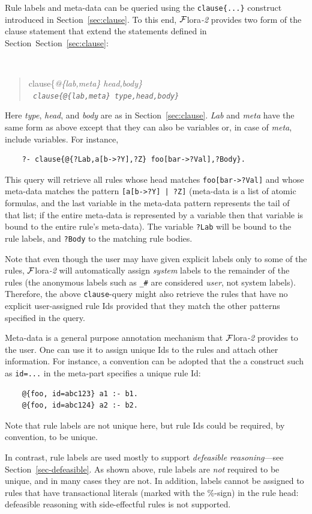 \documentclass[11pt]{article}
\newcommand{\FLORA}{{\mbox{\sc ${\cal F}${lora}\rm\emph{-2}}}\xspace}
\begin{document}
Rule labels and meta-data can be queried using the {\tt clause\{...\}}
construct introduced in Section~\ref{sec:clause}. To this end, \FLORA
provides two form of the clause statement that extend the statements
defined in Section~Section~\ref{sec:clause}:
{\tt
\begin{quote}
clause\{\it{@\{lab,meta\} head,body}\}\\
\tt
clause\{\it{@\{lab,meta\} type,head,body}\}
\end{quote}
}
Here \emph{type}, \emph{head}, and \emph{body} are as in
Section~\ref{sec:clause}. \emph{Lab} and \emph{meta} have the same form as
above except that they can also be variables or, in case of \emph{meta},
include variables. For instance,
\begin{verbatim}
    ?- clause{@{?Lab,a[b->?Y],?Z} foo[bar->?Val],?Body}.
\end{verbatim}
This query will retrieve all rules whose head matches {\tt foo[bar->?Val]}
and whose meta-data matches the pattern {\tt [a[b->?Y] | ?Z]} (meta-data is
a list of atomic formulas, and the last variable in the meta-data pattern
represents the tail of that list; if the entire meta-data is represented by
a variable then that variable is bound to the entire rule's meta-data).
The variable {\tt ?Lab} will be bound to the rule labels, and {\tt ?Body}
to the matching rule bodies.

Note that even though the user may have given
explicit labels only to some of the rules, \FLORA will automatically
assign \emph{system} labels to the remainder of the rules (the anonymous
labels such as {\tt \_\#} are considered \emph{user}, not system labels).
Therefore, the above {\tt clause}-query might also retrieve  
the rules that have no explicit user-assigned rule Ids provided that they
match the other patterns specified in the query.

Meta-data is a general purpose annotation mechanism that \FLORA provides to
the user. One can use it to assign unique Ids to the rules and attach other
information. For instance, a convention can be adopted that the a construct
such as {\tt id=...} in the meta-part specifies a unique rule Id:
\begin{verbatim}
    @{foo, id=abc123} a1 :- b1.
    @{foo, id=abc124} a2 :- b2.
\end{verbatim}
Note that rule labels are not unique here, but rule Ids could be required,
by convention, to be unique.

In contrast, rule labels are used mostly to support \emph{defeasible
  reasoning}---see Section~\ref{sec-defeasible}.  As shown above, rule
labels are \emph{not} required to be unique, and in many cases they are
not. In addition, labels cannot be assigned to rules that have
transactional literals (marked with the \%-sign) in the rule head:
defeasible reasoning with side-effectful rules is not supported.
\end{document}
